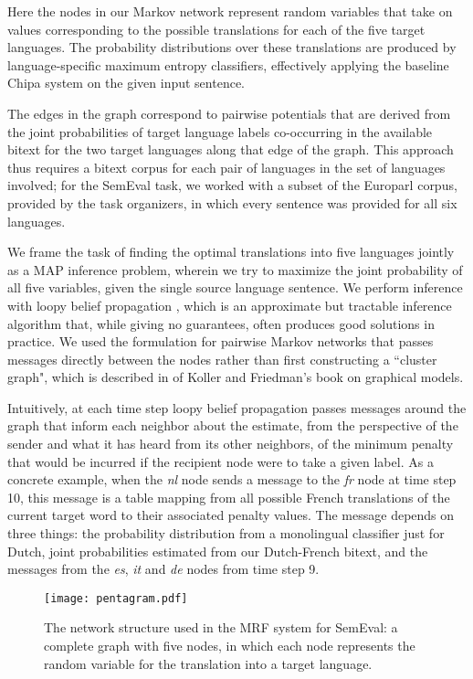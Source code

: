 Here the nodes in our Markov network represent random variables that take on
values corresponding to the possible translations for each of the five target
languages. The probability distributions over these translations are produced
by language-specific maximum entropy classifiers, effectively applying the
baseline Chipa system on the given input sentence.

The edges in the graph correspond to pairwise potentials that are derived from
the joint probabilities of target language labels co-occurring in the available
bitext for the two target languages along that edge of the graph. This approach
thus requires a bitext corpus for each pair of languages in the set of
languages involved; for the SemEval task, we worked with a subset of the
Europarl corpus, provided by the task organizers, in which every sentence was
provided for all six languages.

We frame the task of finding the optimal translations into five languages
jointly as a MAP inference problem, wherein we try to maximize the joint
probability of all five variables, given the single source language sentence.
We perform inference with loopy belief propagation
\cite{DBLP:conf/uai/MurphyWJ99}, which is an approximate but tractable
inference algorithm that, while giving no guarantees, often produces good
solutions in practice.
We used the formulation for pairwise Markov networks that passes messages
directly between the nodes rather than first constructing a ``cluster graph",
which is described in \cite[\S 11.3.5.1]{Koller+Friedman:09} of Koller and
Friedman's book on graphical models.

Intuitively, at each time step loopy belief propagation passes messages around
the graph that inform each neighbor about the estimate, from the perspective of
the sender and what it has heard from its other neighbors, of the minimum
penalty that would be incurred if the recipient node were to take a given
label. As a concrete example, when the \emph{nl} node sends a message to the
\emph{fr} node at time step 10, this message is a table mapping from all
possible French translations of the current target word to their associated
penalty values. The message depends on three things: the probability
distribution from a monolingual classifier just for Dutch, joint probabilities
estimated from our Dutch-French bitext, and the messages from the \emph{es},
\emph{it} and \emph{de} nodes from time step 9.

\begin{figure}
  \begin{center}
  \texttt{[image: pentagram.pdf]}
  \end{center}
  \caption{The network structure used in the MRF system for SemEval: a complete
  graph with five nodes, in which each node represents the random variable for
  the translation into a target language.}
  \label{fig:pentagram}
\end{figure}

